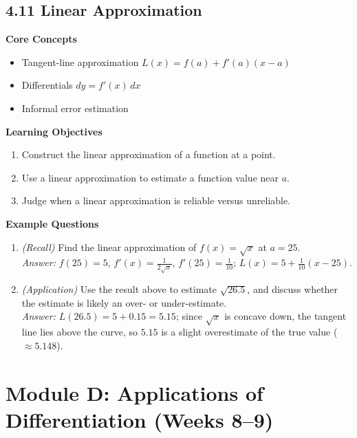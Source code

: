 \documentclass[11pt]{article}
\begin{document}
\subsection{4.11 Linear Approximation}
\textbf{Core Concepts}
\begin{itemize}
\item Tangent-line approximation $L(x) = f(a)+f'(a)(x-a)$
\item Differentials $dy = f'(x)\,dx$
\item Informal error estimation
\end{itemize}
\textbf{Learning Objectives}
\begin{enumerate}
\item Construct the linear approximation of a function at a point.
\item Use a linear approximation to estimate a function value near $a$.
\item Judge when a linear approximation is reliable versus unreliable.
\end{enumerate}
\textbf{Example Questions}
\begin{enumerate}
\item \emph{(Recall)} Find the linear approximation of $f(x)=\sqrt{x}$ at $a=25$. \\
\textit{Answer:} $f(25)=5$, $f'(x)=\frac{1}{2\sqrt{x}}$, $f'(25)=\frac{1}{10}$; $L(x) = 5 + \frac{1}{10}(x-25)$.
\item \emph{(Application)} Use the result above to estimate $\sqrt{26.5}$, and discuss whether the estimate is likely an over- or under-estimate. \\
\textit{Answer:} $L(26.5)=5+0.15=5.15$; since $\sqrt{x}$ is concave down, the tangent line lies above the curve, so $5.15$ is a slight overestimate of the true value ($\approx5.148$).
\end{enumerate}

\section{Module D: Applications of Differentiation (Weeks 8--9)}
\end{document}
